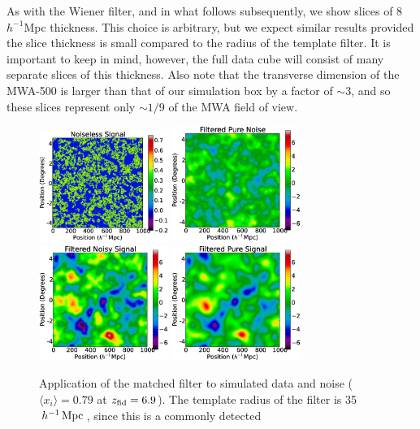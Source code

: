 As with the Wiener filter,
and in what follows subsequently, we show slices of $8$ $h^{-1}$Mpc thickness. This
choice is arbitrary, but we expect similar results provided the slice thickness
is small compared to the radius of the template filter. It is important to keep
in mind, however, the full data cube will consist of many separate slices
of this thickness. Also note that the transverse dimension of the MWA-500 is larger
than that of our simulation box by a factor of $\sim 3$, and so these slices represent only $\sim 1/9$
of the MWA field of view.


\begin{figure}[h]
  \centering
  \includegraphics[width=4.2cm]{f5a.eps}
  \includegraphics[width=4.2cm]{f5b.eps}
  \includegraphics[width=4.2cm]{f5c.eps}
  \includegraphics[width=4.2cm]{f5d.eps}
  \caption{Application of the matched filter to simulated data and
    noise ($\langle x_i \rangle  = 0.79$ at $z_{\rm fid} = 6.9$). The 
    template radius
    of the filter is 35$\,h^{-1}\,{\rm Mpc}\,$, since this is a commonly detected
}
\end{figure}
